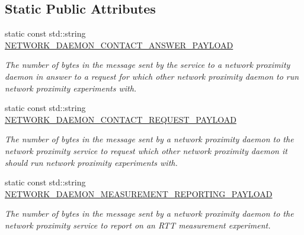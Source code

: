 \subsection*{Static Public Attributes}
\begin{DoxyCompactItemize}
\item 
\mbox{\label{classwrench_1_1_network_proximity_service_message_payload_ad265658bc0467be580921500ba87e4ae}} 
static const std\+::string \hyperlink{classwrench_1_1_network_proximity_service_message_payload_ad265658bc0467be580921500ba87e4ae}{N\+E\+T\+W\+O\+R\+K\+\_\+\+D\+A\+E\+M\+O\+N\+\_\+\+C\+O\+N\+T\+A\+C\+T\+\_\+\+A\+N\+S\+W\+E\+R\+\_\+\+P\+A\+Y\+L\+O\+AD}
\begin{DoxyCompactList}\small\item\em The number of bytes in the message sent by the service to a network proximity daemon in answer to a request for which other network proximity daemon to run network proximity experiments with. \end{DoxyCompactList}\item 
\mbox{\label{classwrench_1_1_network_proximity_service_message_payload_aea4a6c68427d8867a296712dd932de76}} 
static const std\+::string \hyperlink{classwrench_1_1_network_proximity_service_message_payload_aea4a6c68427d8867a296712dd932de76}{N\+E\+T\+W\+O\+R\+K\+\_\+\+D\+A\+E\+M\+O\+N\+\_\+\+C\+O\+N\+T\+A\+C\+T\+\_\+\+R\+E\+Q\+U\+E\+S\+T\+\_\+\+P\+A\+Y\+L\+O\+AD}
\begin{DoxyCompactList}\small\item\em The number of bytes in the message sent by a network proximity daemon to the network proximity service to request which other network proximity daemon it should run network proximity experiments with. \end{DoxyCompactList}\item 
\mbox{\label{classwrench_1_1_network_proximity_service_message_payload_ab1c52bc80c038950b69e861a3fba75a6}} 
static const std\+::string \hyperlink{classwrench_1_1_network_proximity_service_message_payload_ab1c52bc80c038950b69e861a3fba75a6}{N\+E\+T\+W\+O\+R\+K\+\_\+\+D\+A\+E\+M\+O\+N\+\_\+\+M\+E\+A\+S\+U\+R\+E\+M\+E\+N\+T\+\_\+\+R\+E\+P\+O\+R\+T\+I\+N\+G\+\_\+\+P\+A\+Y\+L\+O\+AD}
\begin{DoxyCompactList}\small\item\em The number of bytes in the message sent by a network proximity daemon to the network proximity service to report on an R\+TT measurement experiment. \end{DoxyCompactList}\item 

\end{DoxyCompactItemize}
